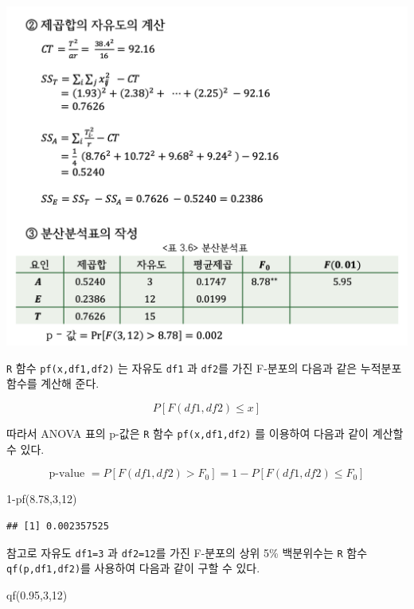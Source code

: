 \documentclass[
]{book}
\newenvironment{Shaded}{\begin{snugshade}}{\end{snugshade}}
\newcommand{\DecValTok}[1]{\textcolor[rgb]{0.00,0.00,0.81}{#1}}
\newcommand{\FloatTok}[1]{\textcolor[rgb]{0.00,0.00,0.81}{#1}}
\newcommand{\FunctionTok}[1]{\textcolor[rgb]{0.00,0.00,0.00}{#1}}
\newcommand{\NormalTok}[1]{#1}
\newcommand{\SpecialCharTok}[1]{\textcolor[rgb]{0.00,0.00,0.00}{#1}}
\begin{document}
\includegraphics{oneway-hand-2.png}

\texttt{R} 함수 \texttt{pf(x,df1,df2)} 는 자유도 \texttt{df1} 과 \texttt{df2}를 가진 F-분포의 다음과 같은 누적분포함수를 계산해 준다.

\[ P [ F(df1,df2) \le x ] \]

따라서 ANOVA 표의 p-값은 \texttt{R} 함수 \texttt{pf(x,df1,df2)} 를 이용하여 다음과 같이 계산할 수 있다.

\[ \text{p-value } = P [ F(df1,df2) > F_0 ]= 1- P [ F(df1,df2) \le F_0 ] \]

\begin{Shaded}
\begin{Highlighting}[]
\DecValTok{1}\SpecialCharTok{{-}}\FunctionTok{pf}\NormalTok{(}\FloatTok{8.78}\NormalTok{,}\DecValTok{3}\NormalTok{,}\DecValTok{12}\NormalTok{)}
\end{Highlighting}
\end{Shaded}

\begin{verbatim}
## [1] 0.002357525
\end{verbatim}

참고로 자유도 \texttt{df1=3} 과 \texttt{df2=12}를 가진 F-분포의 상위 5\% 백분위수는 \texttt{R} 함수 \texttt{qf(p,df1,df2)}를 사용하여 다음과 같이 구할 수 있다.

\begin{Shaded}
\begin{Highlighting}[]
\FunctionTok{qf}\NormalTok{(}\FloatTok{0.95}\NormalTok{,}\DecValTok{3}\NormalTok{,}\DecValTok{12}\NormalTok{)}
\end{Highlighting}
\end{Shaded}
\end{document}
